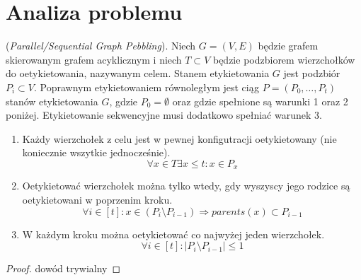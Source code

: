 \chapter{Analiza problemu}
\thispagestyle{chapterBeginStyle}
\label{rozdzial1}

\begin{definition}
	(\textit{Parallel/Sequential Graph Pebbling}). Niech $G = (V, E)$ będzie grafem skierowanym grafem acyklicznym i niech $T \subset V$ będzie podzbiorem wierzchołków do oetykietowania, nazywanym celem.
	Stanem etykietowania $G$ jest podzbiór $P_{i} \subset V$.
	Poprawnym etykietowaniem równoległym jest ciąg $P = (P_{0}, \dots , P_{t})$ stanów etykietowania $G$,
	gdzie $P_{0} = \emptyset $ oraz gdzie spełnione są warunki 1 oraz 2 poniżej.
	Etykietowanie sekwencyjne musi dodatkowo spełniać warunek 3.
	\begin{enumerate}
		\item Każdy wierzchołek z celu jest w pewnej konfigutracji oetykietowany (nie koniecznie wszytkie jednocześnie).
		$$ \forall x \in T \exists x \leq t : x \in P_{x} $$
		
		\item Oetykietować wierzchołek można tylko wtedy, gdy wyszyscy jego rodzice
		są oetykietowani w poprzenim kroku.
		$$ \forall i \in [t] : x \in (P_{i} \setminus P_{i-1}) \Rightarrow parents(x) \subset P_{i-1} $$
		
		\item W każdym kroku można oetykietować co najwyżej jeden wierzchołek.
		$$ \forall i \in [t]: | P_{i} \setminus P_{i-1} | \leq 1 $$
	\end{enumerate}
\end{definition}


\begin{proof}
	dowód trywialny
\end{proof}

